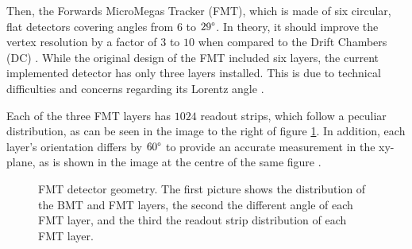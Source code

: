     Then, the Forwards MicroMegas Tracker (FMT), which is made of six circular, flat detectors covering angles from $6$ to $29\degree$.
    In theory, it should improve the vertex resolution by a factor of $3$ to $10$ when compared to the Drift Chambers (DC) \cite{aune2009}.
    While the original design of the FMT included six layers, the current implemented detector has only three layers installed.
    This is due to technical difficulties and concerns regarding its Lorentz angle \cite{konczykowski2010}.
    
    Each of the three FMT layers has $1024$ readout strips, which follow a peculiar distribution, as can be seen in the image to the right of figure \ref{fig::fmt_geometry}.
    In addition, each layer's orientation differs by $60\degree$ to provide an accurate measurement in the xy-plane, as is shown in the image at the centre of the same figure \cite{acker2020mvt}.
    
    \begin{figure}[t]
        \centering{}
        \caption[FMT detector geometry.]{FMT detector geometry. The first picture shows the distribution of the BMT and FMT layers, the second the different angle of each FMT layer, and the third the readout strip distribution of each FMT layer.}
        \label{fig::fmt_geometry}
    \end{figure}

